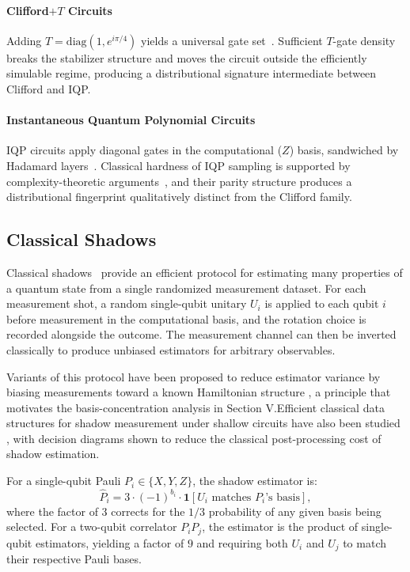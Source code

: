 \documentclass[conference]{IEEEtran}
\begin{document}
\paragraph{Clifford$+T$ Circuits}
Adding $T = \mathrm{diag}(1, e^{i\pi/4})$ yields a universal gate set~\cite{boykin1999universal}.
Sufficient $T$-gate density breaks the stabilizer structure and moves the circuit outside the efficiently simulable regime, producing a distributional signature intermediate between Clifford and IQP.

\paragraph{Instantaneous Quantum Polynomial Circuits}
IQP circuits apply diagonal gates in the computational ($Z$) basis, sandwiched by Hadamard layers~\cite{shepherd2008instantaneous}.
Classical hardness of IQP sampling is supported by complexity-theoretic arguments~\cite{bremner2016average}, and their 
parity structure produces a distributional fingerprint qualitatively distinct from the Clifford family.

\subsection{Classical Shadows}

Classical shadows~\cite{huang2020predicting} provide an efficient protocol for estimating many properties of a quantum state from a single randomized measurement dataset.
For each measurement shot, a random single-qubit unitary $U_i$ is applied to each qubit $i$ before measurement in the computational basis, and the rotation choice is recorded alongside the outcome.
The measurement channel can then be inverted classically to produce unbiased estimators for arbitrary observables.

Variants of this protocol have been proposed to reduce estimator variance by biasing measurements toward a known Hamiltonian structure \cite{hadfield2022measurements}, 
a principle that motivates the basis-concentration analysis in Section V.Efficient classical data structures for shadow measurement under shallow circuits have also been studied \cite{hillmich2021decision}, 
with decision diagrams shown to reduce the classical post-processing cost of shadow estimation.

For a single-qubit Pauli $P_i \in \{X, Y, Z\}$, the shadow estimator is:
\begin{equation}
\hat{P}_i = 3 \cdot (-1)^{b_i} \cdot \mathbf{1}[U_i \text{ matches } P_i\text{'s basis}],
\label{eq:shadow_estimator}
\end{equation}
where the factor of 3 corrects for the $1/3$ probability of any given basis being selected.
For a two-qubit correlator $P_i P_j$, the estimator is the product of single-qubit estimators, yielding a factor of $9$ and requiring both $U_i$ and $U_j$ to match their respective Pauli bases.
\end{document}

